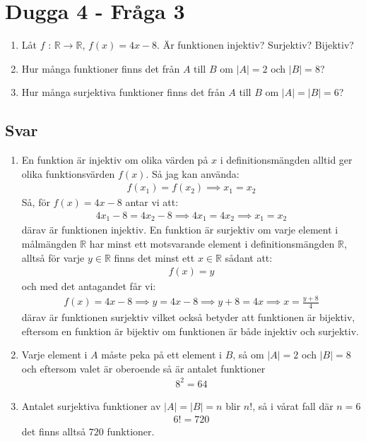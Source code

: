 \documentclass[a4paper,12pt]{article}
\begin{document}
\section{Dugga 4 - Fråga 3}
\begin{enumerate}[label=\alph*)]
    \item Låt $f$ : $\mathbb{R} \rightarrow \mathbb{R}$, $f(x) = 4x - 8$. Är funktionen
    injektiv? Surjektiv? Bijektiv?
    \item Hur många funktioner finns det från $A$ till $B$ om $|A| = 2$ och
    $|B| = 8$?
    \item Hur många surjektiva funktioner finns det från $A$ till $B$ om $|A| =
    |B| = 6$?
\end{enumerate}
\subsection*{Svar}
\begin{enumerate}[label=\alph*)]
    \item En funktion är injektiv om olika värden på $x$ i definitionsmängden
    alltid ger olika funktionsvärden $f(x)$. Så jag kan använda:
    \begin{align*}
        f(x_1) = f(x_2) \implies x_1 = x_2
    \end{align*}
    Så, för $f(x) = 4x - 8$ antar vi
    att:
    \begin{align*}
        4x_1 - 8 = 4x_2 - 8 \implies 4x_1 = 4x_2 \implies x_1 = x_2
    \end{align*}
    därav är funktionen injektiv. En funktion är surjektiv om varje element i
    målmängden $\mathbb{R}$ har minst ett motsvarande element i
    definitionsmängden $\mathbb{R}$, alltså för varje $y \in \mathbb{R}$ finns
    det minst ett $x \in \mathbb{R}$ sådant att:
    \begin{align*}
        f(x) = y
    \end{align*}
    och med det antagandet får vi:
    \begin{align*}
        f(x) = 4x - 8 \implies y = 4x - 8 \implies y + 8 = 4x \implies x = \frac{y+8}{4}
    \end{align*}
    därav är funktionen surjektiv vilket också betyder att funktionen är
    bijektiv, eftersom en funktion är bijektiv om funktionen är både injektiv
    och surjektiv.
    \item Varje element i $A$ måste peka på ett element i $B$, så om $|A| = 2$
    och $|B| = 8$ och eftersom valet är oberoende så är antalet funktioner
    \begin{align*}
        8^2 = 64
    \end{align*}
    \item Antalet surjektiva funktioner av $|A| = |B| = n$ blir $n!$, så i
    vårat fall där $n = 6$
    \begin{align*}
        6! = 720
    \end{align*}
    det finns alltså $720$ funktioner.
\end{enumerate}
\end{document}
